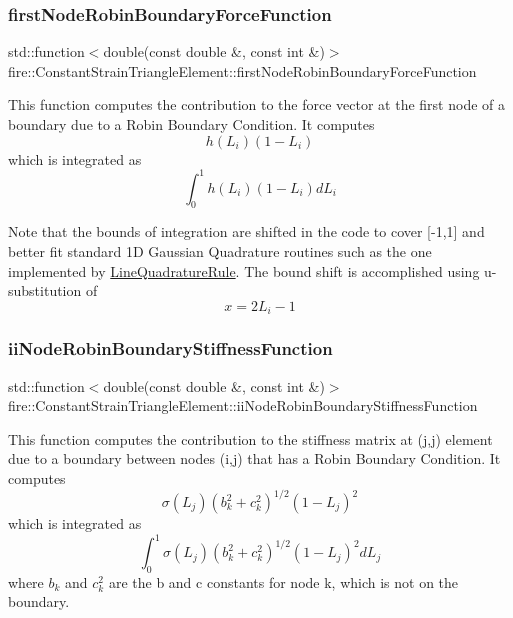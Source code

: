 \subsubsection{\texorpdfstring{first\+Node\+Robin\+Boundary\+Force\+Function}{firstNodeRobinBoundaryForceFunction}}
{\footnotesize\ttfamily std\+::function$<$double(const double \&, const int \&)$>$ fire\+::\+Constant\+Strain\+Triangle\+Element\+::first\+Node\+Robin\+Boundary\+Force\+Function\hspace{0.3cm}{\ttfamily [protected]}}

This function computes the contribution to the force vector at the first node of a boundary due to a Robin Boundary Condition. It computes \[ h(L_{i})(1-L_{i}) \] which is integrated as \[ \int_{0}^{1} h(L_{i})(1-L_{i}) dL_{i} \]

Note that the bounds of integration are shifted in the code to cover \mbox{[}-\/1,1\mbox{]} and better fit standard 1D Gaussian Quadrature routines such as the one implemented by \hyperlink{a00885}{Line\+Quadrature\+Rule}. The bound shift is accomplished using u-\/substitution of \[ x = 2L_{i} - 1 \] \mbox{\label{a00789_a4251a56fbd95ceb58072c20cf905fdfb}} 
\subsubsection{\texorpdfstring{ii\+Node\+Robin\+Boundary\+Stiffness\+Function}{iiNodeRobinBoundaryStiffnessFunction}}
{\footnotesize\ttfamily std\+::function$<$double(const double \&, const int \&)$>$ fire\+::\+Constant\+Strain\+Triangle\+Element\+::ii\+Node\+Robin\+Boundary\+Stiffness\+Function\hspace{0.3cm}{\ttfamily [protected]}}

This function computes the contribution to the stiffness matrix at (j,j) element due to a boundary between nodes (i,j) that has a Robin Boundary Condition. It computes \[ \sigma(L_{j})(b_{k}^2 + c_{k}^2)^{1/2}(1-L_{j})^{2} \] which is integrated as \[ \int_{0}^{1} \sigma(L_{j})(b_{k}^2 + c_{k}^2)^{1/2}(1-L_{j})^{2} dL_{j} \] where $b_{k}$ and $c_{k}^2$ are the b and c constants for node k, which is not on the boundary.

